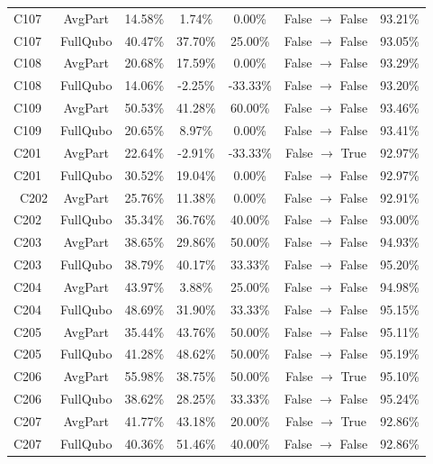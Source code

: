 \documentclass[conference]{IEEEtran}
\begin{document}
\begin{table}[htbp]
{\begin{tabular}{lcccccc}
C107 & AvgPart & 14.58\% & 1.74\% & 0.00\% & False $\to$ False & 93.21\% \\
C107 & FullQubo & 40.47\% & 37.70\% & 25.00\% & False $\to$ False & 93.05\% \\

C108 & AvgPart & 20.68\% & 17.59\% & 0.00\% & False $\to$ False & 93.29\% \\
C108 & FullQubo & 14.06\% & -2.25\% & -33.33\% & False $\to$ False & 93.20\% \\

C109 & AvgPart & 50.53\% & 41.28\% & 60.00\% & False $\to$ False & 93.46\% \\
C109 & FullQubo & 20.65\% & 8.97\% & 0.00\% & False $\to$ False & 93.41\% \\

C201 & AvgPart & 22.64\% & -2.91\% & -33.33\% & False $\to$ True & 92.97\% \\
C201 & FullQubo & 30.52\% & 19.04\% & 0.00\% & False $\to$ False & 92.97\% \\
\
C202 & AvgPart & 25.76\% & 11.38\% & 0.00\% & False $\to$ False & 92.91\% \\
C202 & FullQubo & 35.34\% & 36.76\% & 40.00\% & False $\to$ False & 93.00\% \\

C203 & AvgPart & 38.65\% & 29.86\% & 50.00\% & False $\to$ False & 94.93\% \\
C203 & FullQubo & 38.79\% & 40.17\% & 33.33\% & False $\to$ False & 95.20\% \\

C204 & AvgPart & 43.97\% & 3.88\% & 25.00\% & False $\to$ False & 94.98\% \\
C204 & FullQubo & 48.69\% & 31.90\% & 33.33\% & False $\to$ False & 95.15\% \\

C205 & AvgPart & 35.44\% & 43.76\% & 50.00\% & False $\to$ False & 95.11\% \\
C205 & FullQubo & 41.28\% & 48.62\% & 50.00\% & False $\to$ False & 95.19\% \\

C206 & AvgPart & 55.98\% & 38.75\% & 50.00\% & False $\to$ True & 95.10\% \\
C206 & FullQubo & 38.62\% & 28.25\% & 33.33\% & False $\to$ False & 95.24\% \\

C207 & AvgPart & 41.77\% & 43.18\% & 20.00\% & False $\to$ True & 92.86\% \\
C207 & FullQubo & 40.36\% & 51.46\% & 40.00\% & False $\to$ False & 92.86\% \\


\end{tabular}}
\end{table}
\end{document}
